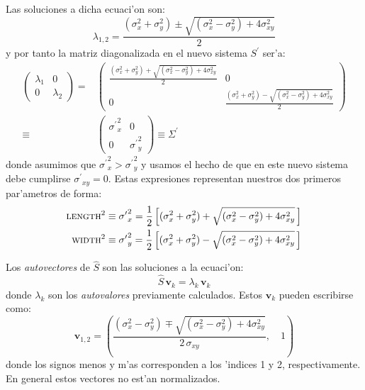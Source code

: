 Las soluciones a dicha ecuaci'on son:
%
\begin{equation}
  \label{eq:eigensol}
  \lambda_{1,2} = \frac{(\sigma_x^2+\sigma_y^2) \pm 
    \sqrt{(\sigma_x^2-\sigma_y^2) + 4\sigma_{xy}^2}}{2}
\end{equation}
%
y por tanto la matriz diagonalizada en el nuevo sistema $S^\prime$ ser'a:
%
\begin{equation}
  \begin{split}
    \label{eq:Snew}
    \begin{pmatrix}
      \lambda_1 & 0\\0 & \lambda_2
    \end{pmatrix}
    = &
    \begin{pmatrix}
      \displaystyle \frac{(\sigma_x^2+\sigma_y^2) +
        \sqrt{(\sigma_x^2-\sigma_y^2) + 4\sigma_{xy}^2}}{2} & 0 \\
      0 & \displaystyle \frac{(\sigma_x^2+\sigma_y^2) - 
        \sqrt{(\sigma_x^2-\sigma_y^2) + 4\sigma_{xy}^2}}{2}
    \end{pmatrix}\\
    \equiv &
    \begin{pmatrix}
      {\sigma^\prime}_x^2 & 0\\0 & {\sigma^\prime}_y^2
    \end{pmatrix}
    \equiv {\Sigma^\prime}
  \end{split}
\end{equation}
%
donde asumimos que ${\sigma^\prime}_x^2 > {\sigma^\prime}_y^2$ y usamos el hecho
de que en este nuevo sistema debe cumplirse ${\sigma^\prime}_{xy}=0$. Estas
expresiones representan nuestros dos primeros par'ametros de forma:
%
\begin{align}
  \label{eq:lengthwidth}
  \text{\scshape length}^2 &\equiv {\sigma^\prime}_x^2 = 
  \frac{1}{2}\left[(\sigma_x^2+\sigma_y^2) +
    \sqrt{(\sigma_x^2-\sigma_y^2) + 4\sigma_{xy}^2}\,\right] \\
  \text{\scshape width}^2 &\equiv {\sigma^\prime}_y^2 = 
  \frac{1}{2}\left[(\sigma_x^2+\sigma_y^2) -
    \sqrt{(\sigma_x^2-\sigma_y^2) + 4\sigma_{xy}^2}\,\right]
\end{align}

Los \emph{autovectores} de $\hat{S}$ son las soluciones a la
ecuaci'on:
%
\begin{equation}
  \label{eq:eigenveceq}
  \hat{S}\,\mathbf{v}_k = \lambda_k\,\mathbf{v}_k
\end{equation}
%
donde $\lambda_k$ son los \emph{autovalores} previamente
calculados. Estos $\mathbf{v}_k$ pueden escribirse como:
%
\begin{equation}
  \label{eq:eigenvec}
  \mathbf{v}_{1,2} = \left(
    \frac{(\sigma_x^2-\sigma_y^2) \mp
      \sqrt{(\sigma_x^2-\sigma_y^2) + 4\sigma_{xy}^2}}{2\,\sigma_{xy}},
    \quad 1 \right)
\end{equation}
%
donde los signos menos y m'as corresponden a los 'indices 1 y 2,
respectivamente. En general estos vectores no est'an normalizados.

